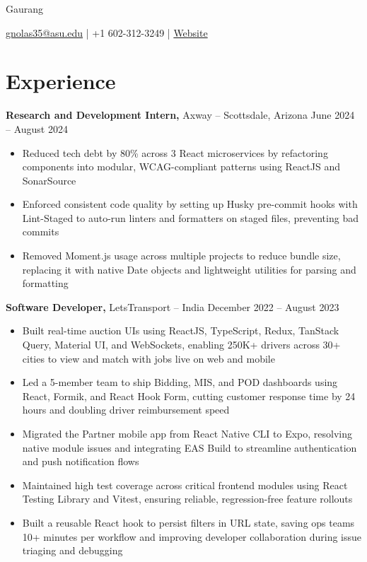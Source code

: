 \documentclass[11pt]{article}       %
\begin{document}
\centerline{\Huge Gaurang}
\vspace{5pt}

\centerline{\href{mailto:gnolas35@asu.edu}{gnolas35@asu.edu} | +1 602-312-3249 
| \href{https://portfolio-sinedd777s-projects.vercel.app/}{Website}}
\vspace{-10pt}

\section*{Experience}
\textbf{Research and Development Intern,} {Axway} -- Scottsdale, Arizona \hfill June 2024 -- August 2024 \\
\vspace{-9pt}
\begin{itemize}
\item Reduced tech debt by 80\% across 3 React microservices by refactoring components into modular, WCAG-compliant patterns using ReactJS and SonarSource
\item Enforced consistent code quality by setting up Husky pre-commit hooks with Lint-Staged to auto-run linters and formatters on staged files, preventing bad commits
\item Removed Moment.js usage across multiple projects to reduce bundle size, replacing it with native Date objects and lightweight utilities for parsing and formatting
\end{itemize}
\vspace{10pt}

\textbf{Software Developer,} {LetsTransport} -- India \hfill December 2022 -- August 2023 \\
\vspace{-9pt}
\begin{itemize}
    \item Built real-time auction UIs using ReactJS, TypeScript, Redux, TanStack Query, Material UI, and WebSockets, enabling 250K+ drivers across 30+ cities to view and match with jobs live on web and mobile
    \item Led a 5-member team to ship Bidding, MIS, and POD dashboards using React, Formik, and React Hook Form, cutting customer response time by 24 hours and doubling driver reimbursement speed
    \item	Migrated the Partner mobile app from React Native CLI to Expo, resolving native module issues and integrating EAS Build to streamline authentication and push notification flows
    \item	Maintained high test coverage across critical frontend modules using React Testing Library and Vitest, ensuring reliable, regression-free feature rollouts
    \item	Built a reusable React hook to persist filters in URL state, saving ops teams 10+ minutes per workflow and improving developer collaboration during issue triaging and debugging
\end{itemize}
\vspace{10pt}
\end{document}
